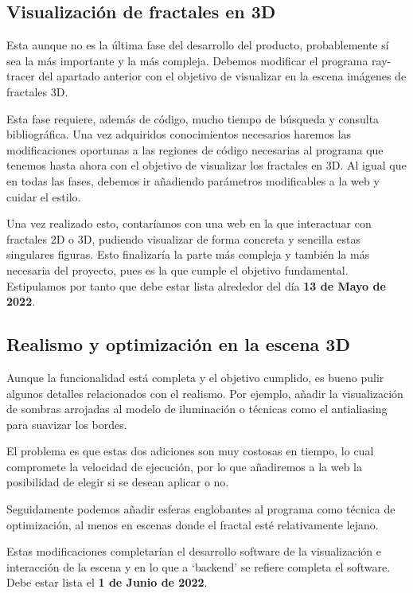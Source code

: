 \subsection*{Visualización de fractales en 3D}

Esta aunque no es la última fase del desarrollo del producto, probablemente sí sea la más importante y la más compleja. Debemos modificar el programa ray-tracer del apartado anterior con el objetivo de visualizar en la escena imágenes de fractales 3D.

Esta fase requiere, además de código, mucho tiempo de búsqueda y consulta bibliográfica. Una vez adquiridos conocimientos necesarios haremos las modificaciones oportunas a las regiones de código necesarias al programa que tenemos hasta ahora con el objetivo de visualizar los fractales en 3D.
Al igual que en todas las fases, debemos ir añadiendo parámetros modificables a la web y cuidar el estilo.

Una vez realizado esto, contaríamos con una web en la que interactuar con fractales 2D o 3D, pudiendo visualizar de forma concreta y sencilla estas singulares figuras. Esto finalizaría la parte más compleja y también la más necesaria del proyecto, pues es la que cumple el objetivo fundamental. Estipulamos por tanto que debe estar lista alrededor del día \textbf{13 de Mayo de 2022}.

\subsection*{Realismo y optimización en la escena 3D}

Aunque la funcionalidad está completa y el objetivo cumplido, es bueno pulir algunos detalles relacionados con el realismo. Por ejemplo, añadir la visualización de sombras arrojadas al modelo de iluminación o técnicas como el antialiasing para suavizar los bordes.

El problema es que estas dos adiciones son muy costosas en tiempo, lo cual compromete la velocidad de ejecución, por lo que añadiremos a la web la posibilidad de elegir si se desean aplicar o no.

Seguidamente podemos añadir esferas englobantes al programa como técnica de optimización, al menos en escenas donde el fractal esté relativamente lejano.

Estas modificaciones completarían el desarrollo software de la visualización e interacción de la escena y en lo que a `backend' se refiere completa el software. Debe estar lista el \textbf{1 de Junio de 2022}.

